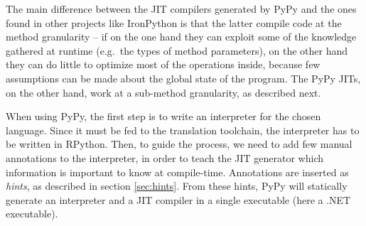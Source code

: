 The main difference between the JIT compilers generated by PyPy and the
ones found in other projects like IronPython is that the latter compile
code at the method granularity -- if on the one hand they can exploit
some of the knowledge gathered at runtime (e.g.\ the types of method
parameters), on the other hand they can do little to optimize most of
the operations inside, because few assumptions can be made about the
global state of the program.  The PyPy JITs, on the other hand, work at
a sub-method granularity, as described next.

When using PyPy, the first step is to write an interpreter for the chosen language.  Since it
must be fed to the translation toolchain, the interpreter has to be written in
RPython.  Then, to guide the process, we need to add few manual
annotations to the interpreter, in order to teach the JIT generator which
information is important to know at compile-time.  Annotations are inserted
as \emph{hints}, as described in section \ref{sec:hints}.
From these hints, PyPy will statically generate an interpreter and a JIT
compiler in a single executable (here a .NET executable).





